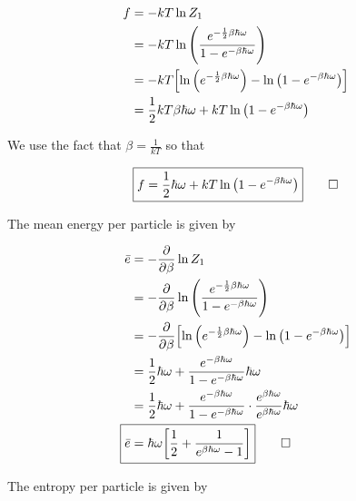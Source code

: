 \documentclass[9pt,a4paper,twocolumn]{article}
\newcommand\ddfrac[2]{\frac{\displaystyle #1}{\displaystyle #2}}
\begin{document}
\begin{enumerate}[(a)]
\begin{align}
	f &= -kT \ln{Z_1} \label{eq:free-energy} \\
	&= -kT \ln\qty(\frac{e^{-\frac{1}{2}\beta\hbar\omega}}{1 - e^{-\beta\hbar\omega}}) \nonumber \\
	&= -kT \qty[\ln\qty(e^{-\frac{1}{2}\beta\hbar\omega}) - \ln\qty(1 - e^{-\beta\hbar\omega})] \nonumber \\
	&= \frac{1}{2}kT\beta\hbar\omega + kT\ln\qty(1 - e^{-\beta\hbar\omega})
\end{align}

We use the fact that $\beta = \ddfrac{1}{kT}$ so that

\begin{equation}
	\boxed{
		f = \frac{1}{2}\hbar\omega + kT\ln\qty(1 - e^{-\beta\hbar\omega})
	} \qed \label{eq:answer-f}
\end{equation}

The mean energy per particle is given by

\begin{align}
	\bar{e} &= -\pdv{\beta}\ln{Z_1} \label{eq:mean-energy} \\
	&= -\pdv{\beta}\ln\qty(\frac{e^{-\frac{1}{2}\beta\hbar\omega}}{1 - e^{-\beta\hbar\omega}}) \nonumber \\
	&= -\pdv{\beta}\qty[\ln\qty(e^{-\frac{1}{2}\beta\hbar\omega}) - \ln\qty(1 - e^{-\beta\hbar\omega})] \nonumber \\
	&= \frac{1}{2}\hbar\omega + \frac{e^{-\beta\hbar\omega}}{1 - e^{-\beta\hbar\omega}}\hbar\omega \nonumber \\
	&= \frac{1}{2}\hbar\omega + \frac{e^{-\beta\hbar\omega}}{1 - e^{-\beta\hbar\omega}} \cdot \frac{e^{\beta\hbar\omega}}{e^{\beta\hbar\omega}} \hbar\omega \nonumber \\
	\Aboxed{
		\bar{e} &= \hbar\omega\qty[\frac{1}{2} + \frac{1}{e^{\beta\hbar\omega} - 1}]
	} \qed \label{eq:answer-e}
\end{align}

The entropy per particle is given by


\end{enumerate}
\end{document}
